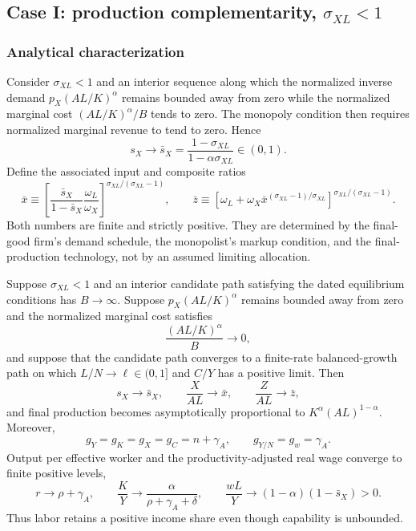 \subsection{\texorpdfstring{Case I: production complementarity, \(\sigma_{XL}<1\)}{Case I: production complementarity, sigma XL < 1}}
\label{sec:axm-case-complements}

\subsubsection{Analytical characterization}

Consider \(\sigma_{XL}<1\) and an interior sequence along which the normalized
inverse demand \(p_X(AL/K)^\alpha\) remains bounded away from zero while the
normalized marginal cost \((AL/K)^\alpha/B\) tends to zero. The monopoly
condition then requires normalized marginal revenue to tend to zero. Hence
\begin{equation}
 s_X\longrightarrow
 \bar s_X=\frac{1-\sigma_{XL}}{1-\alpha\sigma_{XL}}\in(0,1).
 \label{eq:axm-complement-share}
\end{equation}
Define the associated input and composite ratios
\begin{equation}
 \bar x\equiv
 \left[
  \frac{\bar s_X}{1-\bar s_X}\frac{\omega_L}{\omega_X}
 \right]^{\sigma_{XL}/(\sigma_{XL}-1)},
 \qquad
 \bar z\equiv
 \left[\omega_L+\omega_X\bar x^{(\sigma_{XL}-1)/\sigma_{XL}}
 \right]^{\sigma_{XL}/(\sigma_{XL}-1)}.
 \label{eq:axm-complement-ratios}
\end{equation}
Both numbers are finite and strictly positive. They are determined by the
final-good firm's demand schedule, the monopolist's markup condition, and the
final-production technology, not by an assumed limiting allocation.

\begin{proposition}
\label{prop:axm-complements}
Suppose \(\sigma_{XL}<1\) and an interior candidate path satisfying the dated
equilibrium conditions has \(B\to\infty\). Suppose
\(p_X(AL/K)^\alpha\) remains bounded away from zero and the normalized marginal
cost satisfies
\[
 \frac{(AL/K)^\alpha}{B}\to0,
\]
and suppose that the candidate path converges to a finite-rate balanced-growth path
on which \(L/N\to\ell\in(0,1]\) and \(C/Y\) has a positive limit. Then
\begin{equation}
 s_X\to\bar s_X,\qquad \frac{X}{AL}\to\bar x,\qquad
 \frac{Z}{AL}\to\bar z,
 \label{eq:axm-complement-static-limits}
\end{equation}
and final production becomes asymptotically proportional to
\(K^\alpha(AL)^{1-\alpha}\). Moreover,
\[
 g_Y=g_K=g_X=g_C=n+\gamma_A,\qquad g_{Y/N}=g_w=\gamma_A.
\]
Output per effective worker and the productivity-adjusted real wage converge to
finite positive levels,
\begin{equation}
 r\to\rho+\gamma_A,\qquad
 \frac{K}{Y}\to\frac{\alpha}{\rho+\gamma_A+\delta},\qquad
 \frac{wL}{Y}\to(1-\alpha)(1-\bar s_X)>0.
 \label{eq:axm-complement-factor-limits}
\end{equation}
Thus labor retains a positive income share even though capability is unbounded.
\end{proposition}

